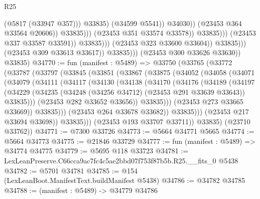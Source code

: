 \begin{lexlean}{R25}
\begin{coremodule}
                                                          (@5817 (@33947 @357)))
                                                        @33835)
                                                      (@34599 @5541))
                                                    @34030))
                                                (@23453 @364 @33564 @20606))
                                              @33835)))
                                        (@23453 @351 @33574 @33578))
                                      @33835)))
                                (@23453 @337 @33587 @33591))
                              @33835)))
                        (@23453 @323 @33600 @33604))
                      @33835)))
                (@23453 @309 @33613 @33617))
              @33835)))
        (@23453 @300 @33626 @33630))
      @33835)
@34770 := fun (manifest : @5489) =>
  @33750
    (@33765
      (@33772
        (@33787
          (@33797
            (@33845
              (@33851
                (@33867
                  (@33875
                    (@34052
                      (@34058
                        (@34071
                          (@34079
                            (@34111
                              (@34117
                                (@34130
                                  (@34138
                                    (@34170
                                      (@34176
                                        (@34189
                                          (@34197
                                            (@34229
                                              (@34235
                                                (@34248 (@34256 @34712) (@23453 @291 @33639 @33643))
                                                @33835)))
                                          (@23453 @282 @33652 @33656))
                                        @33835)))
                                  (@23453 @273 @33665 @33669))
                                @33835)))
                          (@23453 @264 @33678 @33682))
                        @33835)))
                  (@23453 @217 @33694 @33698))
                @33835)))
          (@23453 @193 @33707 @33711))
        @33835)
      (@23710 @33762))
@34771 := @7300 @33726
@34773 := @5664 @34771 @5665
@34774 := @5664 @34773
@34775 := @21846 @33729
@34777 := fun (manifest : @5489) => @34774 @34775
@34779 := @5695 @118 @33723
@34781 := LexLeanPreserve.C66cca9ac7fc4c5ae2bbd07f753f87b5b.R25.__fits_0 @5438
@34782 := @5701 @34781
@34785 := @154 (LexLeanBoot.ManifestText.buildManifest @5438)
@34786 := @34782 @34785
@34788 := (manifest : @5489) -> @34779 @34786

\end{coremodule}
\end{lexlean}
